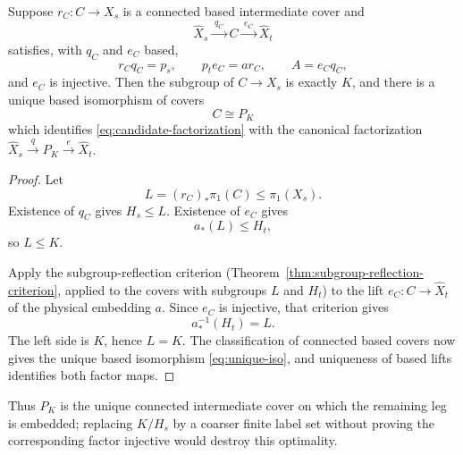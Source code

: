 \begin{theorem}\label{thm:unique-intermediate}
Suppose \( r_C\colon C\to X_s \) is a connected based intermediate cover and
\begin{equation}\label{eq:candidate-factorization}
  \widehat X_s\xrightarrow{\;q_C\;}C\xrightarrow{\;e_C\;}\widehat X_t
\end{equation}
satisfies, with \( q_C \) and \( e_C \) based,
\begin{equation}\label{eq:candidate-compat}
  r_Cq_C=p_s,\qquad p_te_C=ar_C,\qquad A=e_Cq_C,
\end{equation}
and \( e_C \) is injective.  Then the subgroup of \( C\to X_s \) is exactly \( K \), and there is a unique based isomorphism of covers
\begin{equation}\label{eq:unique-iso}
  C\cong P_K
\end{equation}
which identifies \eqref{eq:candidate-factorization} with the canonical factorization \( \widehat X_s\xrightarrow{q}P_K\xrightarrow{e}\widehat X_t \).
\end{theorem}

\begin{proof}
Let
\[
  L=(r_C)_*\pi_1(C)\leq\pi_1(X_s).
\]
Existence of \( q_C \) gives \( H_s\leq L \).  Existence of \( e_C \) gives
\[
  a_*(L)\leq H_t,
\]
so \( L\leq K \).

Apply the subgroup-reflection criterion (Theorem~\ref{thm:subgroup-reflection-criterion}, applied to the covers with subgroups \( L \) and \( H_t \)) to the lift \( e_C\colon C\to\widehat X_t \) of the physical embedding \( a \).  Since \( e_C \) is injective, that criterion gives
\[
  a_*^{-1}(H_t)=L .
\]
The left side is \( K \), hence \( L=K \).  The classification of connected based covers now gives the unique based isomorphism \eqref{eq:unique-iso}, and uniqueness of based lifts identifies both factor maps.
\end{proof}

\begin{remark}
Thus \( P_K \) is the unique connected intermediate cover on which the
remaining leg is embedded; replacing \( K/H_s \) by a coarser finite
label set without proving the corresponding factor injective would
destroy this optimality.
\end{remark}
